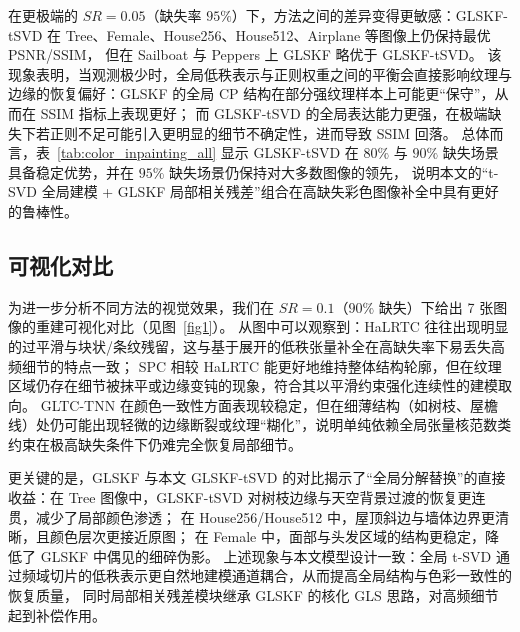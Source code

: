 \documentclass[UTF8]{ctexart}
\begin{document}
在更极端的 $SR=0.05$（缺失率 $95\%$）下，方法之间的差异变得更敏感：GLSKF-tSVD 在 Tree、Female、House256、House512、Airplane 等图像上仍保持最优 PSNR/SSIM，
但在 Sailboat 与 Peppers 上 GLSKF 略优于 GLSKF-tSVD。
该现象表明，当观测极少时，全局低秩表示与正则权重之间的平衡会直接影响纹理与边缘的恢复偏好：GLSKF 的全局 CP 结构在部分强纹理样本上可能更“保守”，从而在 SSIM 指标上表现更好\cite{lei2024glskf}；
而 GLSKF-tSVD 的全局表达能力更强，在极端缺失下若正则不足可能引入更明显的细节不确定性，进而导致 SSIM 回落。
总体而言，表~\ref{tab:color_inpainting_all} 显示 GLSKF-tSVD 在 $80\%$ 与 $90\%$ 缺失场景具备稳定优势，并在 $95\%$ 缺失场景仍保持对大多数图像的领先，
说明本文的“t-SVD 全局建模 + GLSKF 局部相关残差”组合在高缺失彩色图像补全中具有更好的鲁棒性\cite{lei2024glskf}。

\subsection{可视化对比}

为进一步分析不同方法的视觉效果，我们在 $SR=0.1$（$90\%$ 缺失）下给出 7 张图像的重建可视化对比（见图~\ref{fig1}）。
从图中可以观察到：HaLRTC 往往出现明显的过平滑与块状/条纹残留，这与基于展开的低秩张量补全在高缺失率下易丢失高频细节的特点一致\cite{liu2013tensor}；
SPC 相较 HaLRTC 能更好地维持整体结构轮廓，但在纹理区域仍存在细节被抹平或边缘变钝的现象，符合其以平滑约束强化连续性的建模取向\cite{yokota2016smooth}。
GLTC-TNN 在颜色一致性方面表现较稳定，但在细薄结构（如树枝、屋檐线）处仍可能出现轻微的边缘断裂或纹理“糊化”，说明单纯依赖全局张量核范数类约束在极高缺失条件下仍难完全恢复局部细节\cite{chen2025geotensor}。

更关键的是，GLSKF 与本文 GLSKF-tSVD 的对比揭示了“全局分解替换”的直接收益：在 Tree 图像中，GLSKF-tSVD 对树枝边缘与天空背景过渡的恢复更连贯，减少了局部颜色渗透；
在 House256/House512 中，屋顶斜边与墙体边界更清晰，且颜色层次更接近原图；
在 Female 中，面部与头发区域的结构更稳定，降低了 GLSKF 中偶见的细碎伪影。
上述现象与本文模型设计一致：全局 t-SVD 通过频域切片的低秩表示更自然地建模通道耦合，从而提高全局结构与色彩一致性的恢复质量\cite{kilmer2013operators}，
同时局部相关残差模块继承 GLSKF 的核化 GLS 思路，对高频细节起到补偿作用\cite{lei2024glskf}。
\end{document}
